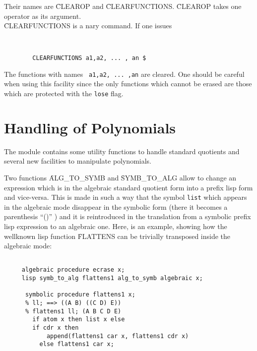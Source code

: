 Their names are \f{CLEAROP} and \f{CLEARFUNCTIONS}.
\f{CLEAROP} takes one operator as its argument.\\
 \f{CLEARFUNCTIONS} is a nary command. If one issues


\begin{verbatim}


        CLEARFUNCTIONS a1,a2, ... , an $

\end{verbatim}
The functions with names \verb+ a1,a2, ... ,an+  are cleared.
One should be careful when  using this facility since the
only functions which cannot be erased are those which are
protected with the \verb+lose+ flag.
\ei
\section{Handling of Polynomials}
The module contains some utility functions to handle
standard quotients and several new facilities to manipulate polynomials.
\bi
\item[i.] Two functions \f{ALG\_TO\_SYMB} and \f{SYMB\_TO\_ALG}
allow to change an expression which is in the algebraic standard
quotient form into a prefix lisp form and vice-versa. This is made
in such a way that the symbol \verb+list+ which appears in the
algebraic mode disappear in the symbolic form (there it becomes
a parenthesis ``()'' ) and it is reintroduced in the translation
from a symbolic prefix lisp expression  to an algebraic one.
Here, is an example, showing how the wellknown lisp function
\f{FLATTENS} can be trivially transposed inside the algebraic mode:
\begin{verbatim}

     algebraic procedure ecrase x;
     lisp symb_to_alg flattens1 alg_to_symb algebraic x;

      symbolic procedure flattens1 x;
      % ll; ==> ((A B) ((C D) E))
      % flattens1 ll; (A B C D E)
        if atom x then list x else
        if cdr x then
            append(flattens1 car x, flattens1 cdr x)
          else flattens1 car x;

\end{verbatim}


